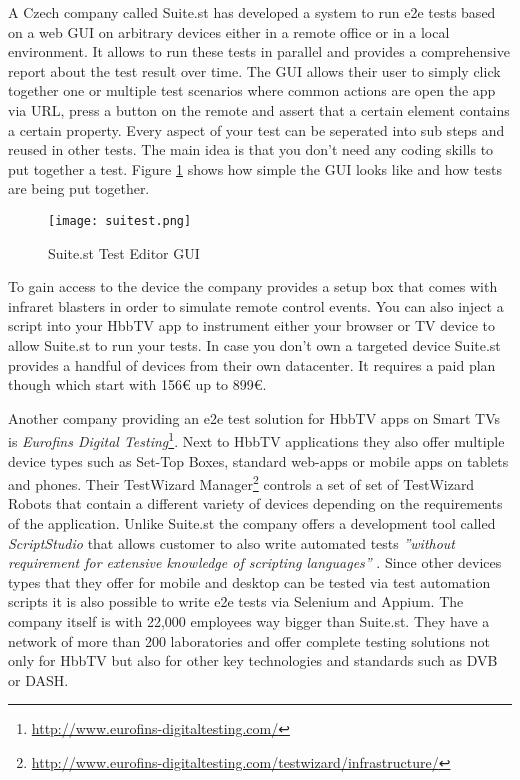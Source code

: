 A Czech company called Suite.st has developed a system to run e2e tests based on a web GUI on
arbitrary devices either in a remote office or in a local environment. It allows to run these
tests in parallel and provides a comprehensive report about the test result over time. The
GUI allows their user to simply click together one or multiple test scenarios where common
actions are open the app via URL, press a button on the remote and assert that a certain element
contains a certain property. Every aspect of your test can be seperated into sub steps and
reused in other tests. The main idea is that you don't need any coding skills to put together
a test. Figure \ref{fig:suitest} shows how simple the GUI looks like and how tests are being put
together.

\begin{figure}[htb]
  \centering
  \texttt{[image: suitest.png]}\\
  \caption{Suite.st Test Editor GUI}\label{fig:suitest}
\end{figure}

To gain access to the device the company provides a setup box that comes with infraret blasters
in order to simulate remote control events. You can also inject a script into your HbbTV app
to instrument either your browser or TV device to allow Suite.st to run your tests. In case
you don't own a targeted device Suite.st provides a handful of devices from their own datacenter.
It requires a paid plan though which start with 156\euro{} up to 899\euro{}.

Another company providing an e2e test solution for HbbTV apps on Smart TVs is \textit{Eurofins Digital Testing}\footnote{\url{http://www.eurofins-digitaltesting.com/}}.
Next to HbbTV applications they also offer multiple device types such as Set-Top Boxes, standard
web-apps or mobile apps on tablets and phones. Their TestWizard Manager\footnote{\url{http://www.eurofins-digitaltesting.com/testwizard/infrastructure/}}
controls a set of set of TestWizard Robots that contain a different variety of devices depending
on the requirements of the application. Unlike Suite.st the company offers a development tool
called \textit{ScriptStudio} that allows customer to also write automated tests \textit{''without
requirement for extensive knowledge of scripting languages''} \cite{scriptstudio}. Since other
devices types that they offer for mobile and desktop can be tested via test automation scripts
it is also possible to write e2e tests via Selenium and Appium. The company itself is with
22,000 employees way bigger than Suite.st. They have a network of more than 200 laboratories and
offer complete testing solutions not only for HbbTV but also for other key technologies and standards
such as DVB or DASH.

